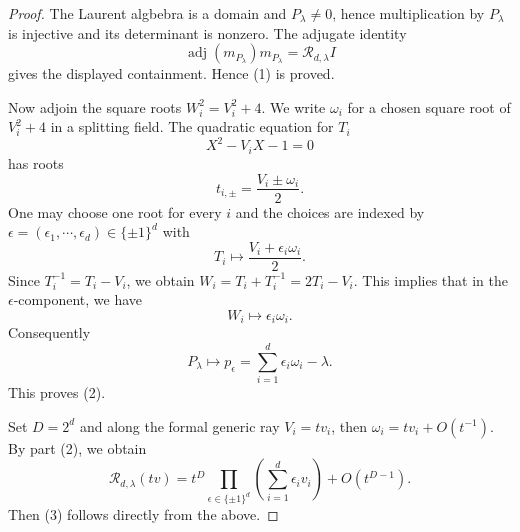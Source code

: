 \documentclass[11pt,reqno]{amsart}
\theoremstyle{definition}
\theoremstyle{plain}
\numberwithin{equation}{section}
\begin{document}
\begin{proof}
    The Laurent algbebra is a domain and $P_\lambda\neq 0$, hence multiplication by $P_\lambda$ is injective and its determinant is nonzero. The adjugate identity
    \begin{equation*}
        \operatorname{adj}(m_{P_\lambda})m_{P_\lambda}=\mathcal{R}_{d,\lambda} I
    \end{equation*}
    gives the displayed containment. Hence (1) is proved.

    Now adjoin the square roots $W_i^2=V_i^2+4$. We write $\omega_i$ for a chosen square root of $V_i^2+4$ in a splitting field. 
    The quadratic equation for $T_i$ 
    \begin{equation*}
        X^2-V_iX-1=0
    \end{equation*}
    has roots
    \begin{equation*}
        t_{i,\pm}=\frac{V_i\pm\omega_i}{2}.
    \end{equation*}
      One may choose one root for every $i$ and the choices are indexed by $\epsilon=(\epsilon_1,\cdots,\epsilon_d)\in \{\pm 1\}^d$
    with 
    \begin{equation*}
        T_i\longmapsto \frac{V_i+\epsilon_i\omega_i}{2}.
    \end{equation*}
    Since $T_i^{-1}=T_i-V_i$, we obtain $W_i=T_i+T_i^{-1}=2T_i-V_i$. This implies that in the $\epsilon$-component, we have
    \begin{equation*}
        W_i\longmapsto \epsilon_i \omega_i.
    \end{equation*}
    Consequently
    \begin{equation*}
        P_\lambda\longmapsto p_\epsilon=\sum_{i=1}^d\epsilon_i \omega_i-\lambda.
    \end{equation*}
    This proves (2).

    Set $D=2^d$ and along the formal generic ray $V_i=tv_i$, then $\omega_i=tv_i+O(t^{-1})$. By part (2), we obtain
    \begin{equation*}
        \mathcal{R}_{d,\lambda}(t v)=t^D\prod_{\epsilon\in\{\pm1\}^d}\left(\sum_{i=1}^d\epsilon_i v_i\right)+O(t^{D-1}).
    \end{equation*}
    Then (3) follows directly from the above.


\end{proof}
\end{document}
